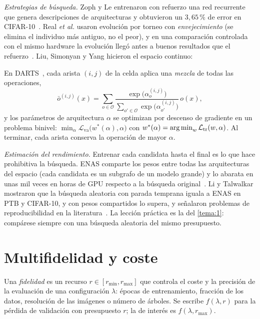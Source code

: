 \emph{Estrategias de búsqueda.} Zoph y Le entrenaron con refuerzo una red recurrente que genera descripciones de arquitecturas y obtuvieron un $3{,}65\,\%$ de error en CIFAR-10~\cite{zoph}. Real \emph{et al.} usaron evolución por torneo con \emph{envejecimiento} (se elimina el individuo más antiguo, no el peor), y en una comparación controlada con el mismo hardware la evolución llegó antes a buenos resultados que el refuerzo~\cite{real}. Liu, Simonyan y Yang hicieron el espacio continuo:

\begin{definicion}\label{def:darts}
En DARTS~\cite{darts}, cada arista $(i,j)$ de la celda aplica una \emph{mezcla} de todas las operaciones,
\[
\bar o^{(i,j)}(x)=\sum_{o\in\mathcal{O}}\frac{\exp\bigl(\alpha^{(i,j)}_{o}\bigr)}{\sum_{o'\in\mathcal{O}}\exp\bigl(\alpha^{(i,j)}_{o'}\bigr)}\,o(x),
\]
y los parámetros de arquitectura $\alpha$ se optimizan por descenso de gradiente en un problema binivel: $\min_{\alpha}\mathcal{L}_{\mathrm{va}}\bigl(w^{*}(\alpha),\alpha\bigr)$ con $w^{*}(\alpha)=\operatorname*{arg\,min}_{w}\mathcal{L}_{\mathrm{tr}}(w,\alpha)$. Al terminar, cada arista conserva la operación de mayor $\alpha$.
\end{definicion}

\emph{Estimación del rendimiento.} Entrenar cada candidata hasta el final es lo que hace prohibitiva la búsqueda. ENAS comparte los pesos entre todas las arquitecturas del espacio (cada candidata es un subgrafo de un modelo grande) y lo abarata en unas mil veces en horas de GPU respecto a la búsqueda original~\cite{enas}. Li y Talwalkar mostraron que la búsqueda aleatoria con parada temprana iguala a ENAS en PTB y CIFAR-10, y con pesos compartidos lo supera, y señalaron problemas de reproducibilidad en la literatura~\cite{lt}. La lección práctica es la del \cref{tema:1}: compárese siempre con una búsqueda aleatoria del mismo presupuesto.

\section{Multifidelidad y coste}

\begin{definicion}[Fidelidad]\label{def:fidelidad}
Una \emph{fidelidad} es un recurso $r\in[r_{\min},r_{\max}]$ que controla el coste y la precisión de la evaluación de una configuración $\lambda$: épocas de entrenamiento, fracción de los datos, resolución de las imágenes o número de árboles. Se escribe $f(\lambda,r)$ para la pérdida de validación con presupuesto $r$; la de interés es $f(\lambda,r_{\max})$.
\end{definicion}

